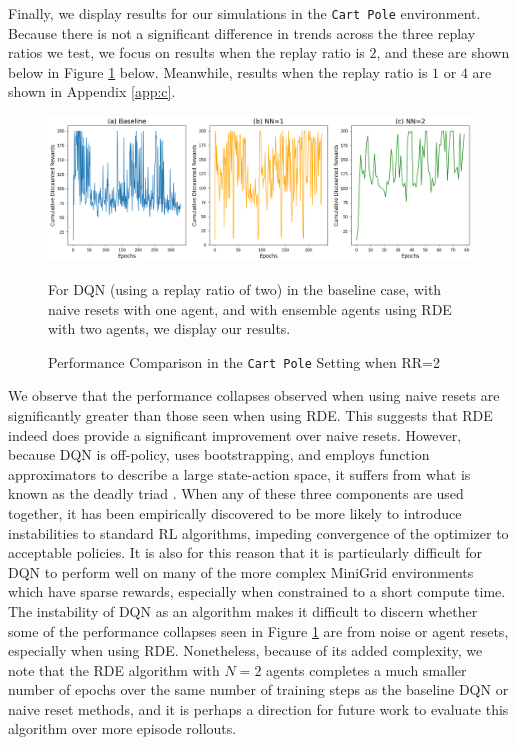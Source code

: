 \documentclass[base]{subfiles}
\begin{document}
Finally, we display results for our simulations in the \texttt{Cart Pole} environment.
Because there is not a significant difference in trends across the three replay ratios we test, we focus on results when the replay ratio is $2$, and these are shown below in Figure \ref{fig:cp_rr2} below.
Meanwhile, results when the replay ratio is $1$ or $4$ are shown in Appendix \ref{app:c}.

\begin{figure}[h!]
	\centering
	\caption{Performance Comparison in the \texttt{Cart Pole} Setting when RR=2}
	\label{fig:cp_rr2}
	\includegraphics[width = 1 \linewidth]{cp_RR2.png}
	\begin{flushleft} For DQN (using a replay ratio of two) in the baseline case, with naive resets with one agent, and with ensemble agents using RDE with two agents, we display our results. \end{flushleft}
\end{figure}

We observe that the performance collapses observed when using naive resets are significantly greater than those seen when using RDE.
This suggests that RDE indeed does provide a significant improvement over naive resets.
However, because DQN is off-policy, uses bootstrapping, and employs function approximators to describe a large state-action space, it suffers from what is known as the deadly triad \cite{hasselt2018}.
When any of these three components are used together, it has been empirically discovered to be more likely to introduce instabilities to standard RL algorithms, impeding convergence of the optimizer to acceptable policies.
It is also for this reason that it is particularly difficult for DQN to perform well on many of the more complex MiniGrid environments which have sparse rewards, especially when constrained to a short compute time.
The instability of DQN as an algorithm makes it difficult to discern whether some of the performance collapses seen in Figure \ref{fig:cp_rr2} are from noise or agent resets, especially when using RDE.
Nonetheless, because of its added complexity, we note that the RDE algorithm with $N=2$ agents completes a much smaller number of epochs over the same number of training steps as the baseline DQN or naive reset methods, and it is perhaps a direction for future work to evaluate this algorithm over more episode rollouts.
\end{document}
